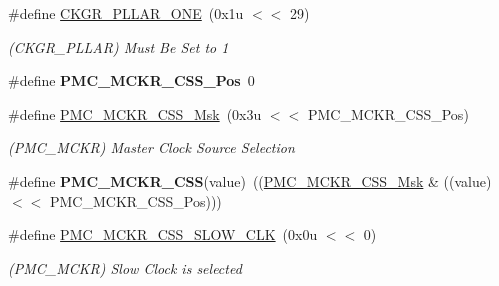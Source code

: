 \begin{DoxyCompactItemize}
\item 
\mbox{\label{group__SAME70__PMC_gaed80bc1a380b51a350df524311967a3e}} 
\#define \mbox{\hyperlink{group__SAME70__PMC_gaed80bc1a380b51a350df524311967a3e}{C\+K\+G\+R\+\_\+\+P\+L\+L\+A\+R\+\_\+\+O\+NE}}~(0x1u $<$$<$ 29)
\begin{DoxyCompactList}\small\item\em (C\+K\+G\+R\+\_\+\+P\+L\+L\+AR) Must Be Set to 1 \end{DoxyCompactList}\item 
\mbox{\label{group__SAME70__PMC_gade7a71e6c8aabb95838f2d0f08f1a4f1}} 
\#define {\bfseries P\+M\+C\+\_\+\+M\+C\+K\+R\+\_\+\+C\+S\+S\+\_\+\+Pos}~0
\item 
\mbox{\label{group__SAME70__PMC_gaf5490e2702410b788902efcf7fc1876c}} 
\#define \mbox{\hyperlink{group__SAME70__PMC_gaf5490e2702410b788902efcf7fc1876c}{P\+M\+C\+\_\+\+M\+C\+K\+R\+\_\+\+C\+S\+S\+\_\+\+Msk}}~(0x3u $<$$<$ P\+M\+C\+\_\+\+M\+C\+K\+R\+\_\+\+C\+S\+S\+\_\+\+Pos)
\begin{DoxyCompactList}\small\item\em (P\+M\+C\+\_\+\+M\+C\+KR) Master Clock Source Selection \end{DoxyCompactList}\item 
\mbox{\label{group__SAME70__PMC_gae0133d836d62b17a81ee91155861817d}} 
\#define {\bfseries P\+M\+C\+\_\+\+M\+C\+K\+R\+\_\+\+C\+SS}(value)~((\mbox{\hyperlink{group__SAMV71__PMC_gaf5490e2702410b788902efcf7fc1876c}{P\+M\+C\+\_\+\+M\+C\+K\+R\+\_\+\+C\+S\+S\+\_\+\+Msk}} \& ((value) $<$$<$ P\+M\+C\+\_\+\+M\+C\+K\+R\+\_\+\+C\+S\+S\+\_\+\+Pos)))
\item 
\mbox{\label{group__SAME70__PMC_gac30f30d82aa0a8e6ffd94e278d561b84}} 
\#define \mbox{\hyperlink{group__SAME70__PMC_gac30f30d82aa0a8e6ffd94e278d561b84}{P\+M\+C\+\_\+\+M\+C\+K\+R\+\_\+\+C\+S\+S\+\_\+\+S\+L\+O\+W\+\_\+\+C\+LK}}~(0x0u $<$$<$ 0)
\begin{DoxyCompactList}\small\item\em (P\+M\+C\+\_\+\+M\+C\+KR) Slow Clock is selected \end{DoxyCompactList}\item 
\mbox{\label{group__SAME70__PMC_ga1083253fbc37fcfcc9aa078dbc35f067}} 

\end{DoxyCompactItemize}
